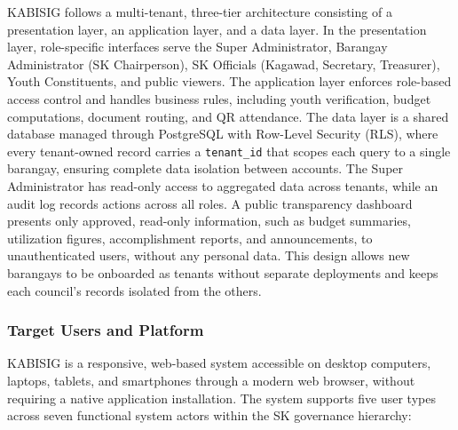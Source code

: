 \hspace*{\parindent}KABISIG follows a multi-tenant, three-tier architecture consisting of a presentation layer, an application layer, and a data layer. In the presentation layer, role-specific interfaces serve the Super Administrator, Barangay Administrator (SK Chairperson), SK Officials (Kagawad, Secretary, Treasurer), Youth Constituents, and public viewers. The application layer enforces role-based access control and handles business rules, including youth verification, budget computations, document routing, and QR attendance. The data layer is a shared database managed through PostgreSQL with Row-Level Security (RLS), where every tenant-owned record carries a \texttt{tenant\_id} that scopes each query to a single barangay, ensuring complete data isolation between accounts. The Super Administrator has read-only access to aggregated data across tenants, while an audit log records actions across all roles. A public transparency dashboard presents only approved, read-only information, such as budget summaries, utilization figures, accomplishment reports, and announcements, to unauthenticated users, without any personal data. This design allows new barangays to be onboarded as tenants without separate deployments and keeps each council's records isolated from the others.
\vspace{5mm}

\subsubsection{Target Users and Platform}
\label{subsubsec:target_users_and_platform}

\hspace*{\parindent}KABISIG is a responsive, web-based system accessible on desktop computers, laptops, tablets, and smartphones through a modern web browser, without requiring a native application installation. The system supports five user types across seven functional system actors within the SK governance hierarchy:

